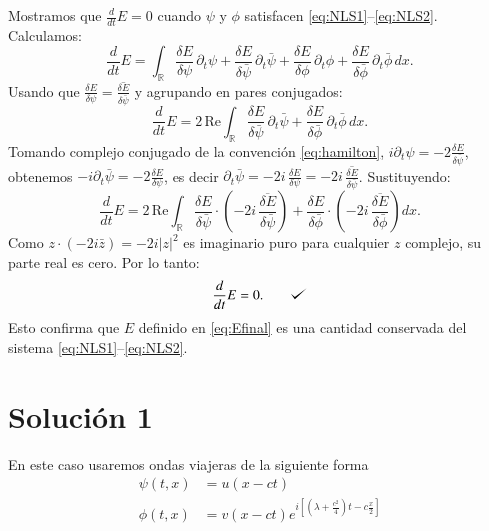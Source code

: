 \documentclass[letterpaper,11pt]{exam}
\def\checkmark{\tikz\fill[scale=0.4](0,.35) -- (.25,0) -- (1,.7) -- (.25,.15) -- cycle;}
\theoremstyle{plain}
\begin{document}
Mostramos que $\frac{d}{dt}E = 0$ cuando $\psi$ y $\phi$ satisfacen
\eqref{eq:NLS1}--\eqref{eq:NLS2}. Calculamos:
\begin{equation}
    \frac{d}{dt}E
    = \int_{\mathbb{R}} \frac{\delta E}{\delta\psi}\,\partial_t\psi
    + \frac{\delta E}{\delta\bar{\psi}}\,\partial_t\bar{\psi}
    + \frac{\delta E}{\delta\phi}\,\partial_t\phi
    + \frac{\delta E}{\delta\bar{\phi}}\,\partial_t\bar{\phi}\,dx.
\end{equation}
Usando que $\frac{\delta E}{\delta\psi} = \overline{\frac{\delta E}{\delta\bar{\psi}}}$
y agrupando en pares conjugados:
\begin{equation}
    \frac{d}{dt}E
    = 2\,\mathrm{Re}\!\int_{\mathbb{R}}
    \frac{\delta E}{\delta\bar{\psi}}\,\partial_t\bar{\psi}
    + \frac{\delta E}{\delta\bar{\phi}}\,\partial_t\bar{\phi}\,dx.
\end{equation}
Tomando complejo conjugado de la convención \eqref{eq:hamilton},
$i\partial_t\psi = -2\frac{\delta E}{\delta\bar\psi}$, obtenemos
$-i\partial_t\bar\psi = -2\frac{\delta E}{\delta\psi}$, es decir
$\partial_t\bar\psi = -2i\,\frac{\delta E}{\delta\psi}
= -2i\,\overline{\frac{\delta E}{\delta\bar\psi}}$.
Sustituyendo:
\begin{equation}
    \frac{d}{dt}E
    = 2\,\mathrm{Re}\!\int_{\mathbb{R}}
    \frac{\delta E}{\delta\bar{\psi}}\cdot\left(-2i\,\overline{\frac{\delta E}{\delta\bar\psi}}\right)
    + \frac{\delta E}{\delta\bar{\phi}}\cdot\left(-2i\,\overline{\frac{\delta E}{\delta\bar\phi}}\right)dx.
\end{equation}
Como $z\cdot(-2i\bar{z}) = -2i|z|^2$ es imaginario puro para cualquier $z$ complejo,
su parte real es cero. Por lo tanto:
\begin{equation}
    \frac{d}{dt}E = 0. \qquad \checkmark
\end{equation}
Esto confirma que $E$ definido en \eqref{eq:Efinal} es una cantidad conservada del
sistema \eqref{eq:NLS1}--\eqref{eq:NLS2}.

\newpage

\section{Solución 1}
En este caso usaremos ondas viajeras de la siguiente forma
\begin{align*}
    \psi(t,x)&=u(x-ct)\\
    \phi(t,x)&=v(x-ct)e^{i[(\lambda+\frac{c^2}{4})t-c\frac{x}{2}]}
\end{align*}
\end{document}
